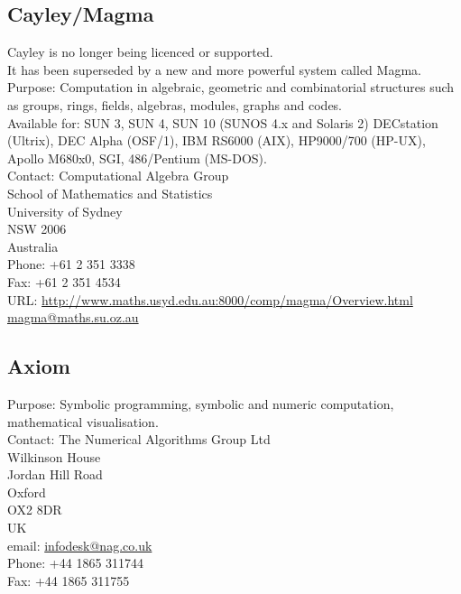 \subsection{Cayley/Magma}
        Cayley is no longer being licenced or supported.\\
        It has been superseded by a new and more powerful system
        called Magma.\\
        Purpose: Computation in algebraic, geometric and
        combinatorial structures such as groups, rings, fields,
        algebras, modules, graphs and codes.\\
        Available for: SUN 3, SUN 4, SUN 10 (SUNOS 4.x and Solaris 2)
        DECstation (Ultrix), DEC Alpha (OSF/1), IBM RS6000 (AIX),
        HP9000/700 (HP-UX), Apollo M680x0, SGI, 486/Pentium (MS-DOS).\\
        Contact: Computational Algebra Group\\
        School of Mathematics and Statistics\\
        University of Sydney\\
        NSW 2006\\
        Australia\\
        Phone:  +61 2 351 3338\\
        Fax: +61 2 351 4534\\
        URL: \url{http://www.maths.usyd.edu.au:8000/comp/magma/Overview.html}\\
        \url{magma@maths.su.oz.au}

\subsection{Axiom}
        Purpose: Symbolic programming, symbolic and numeric computation,
                 mathematical visualisation.\\
        Contact: The Numerical Algorithms Group Ltd\\
        Wilkinson House\\
        Jordan Hill Road\\
        Oxford\\
        OX2 8DR\\
        UK\\
        email: \url{infodesk@nag.co.uk}\\
        Phone: +44 1865 311744\\
        Fax:   +44 1865 311755
